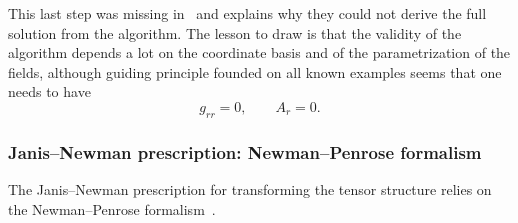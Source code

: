 This last step was missing in~\cite{Newman:1965:MetricRotatingCharged} and explains why they could not derive the full solution from the algorithm.
The lesson to draw is that the validity of the algorithm depends a lot on the coordinate basis\footnotemark{} and of the parametrization of the fields, although guiding principle founded on all known examples seems that one needs to have
\begin{equation}
	g_{rr} = 0, \qquad
	A_r = 0.
\end{equation} 


\subsubsection{Janis--Newman prescription: Newman--Penrose formalism}


The Janis--Newman prescription for transforming the tensor structure relies on the Newman--Penrose formalism~\cite{Newman:1965:NoteKerrSpinningParticle, Newman:1965:MetricRotatingCharged, Adamo:2014:KerrNewmanMetricReview}.


